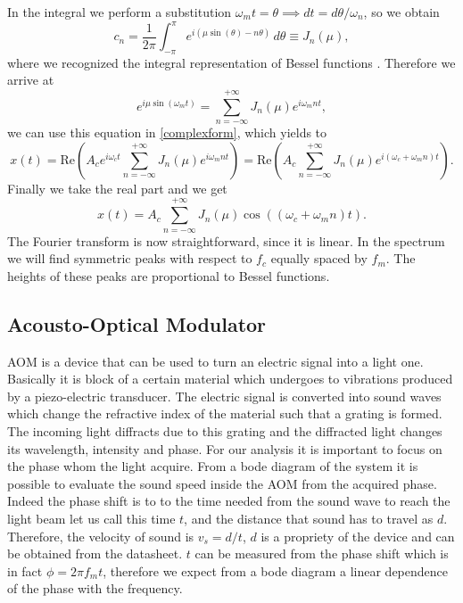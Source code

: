 \documentclass[a4paper,10pt]{article}
\begin{document}
In the integral we perform a substitution $\omega_m t = \theta \implies dt = d\theta/\omega_n$, so we obtain
\[c_n=\frac{1}{2\pi}\int_{-\pi}^{\pi}e^{i(\mu \sin(\theta)-n\theta)}\,d\theta \equiv J_n(\mu),\]
where we recognized the integral representation of Bessel functions \cite{bessel}. Therefore we arrive at
\[e^{i\mu \sin(\omega_m t)} = \sum_{n=-\infty}^{+\infty }J_n(\mu) e^{i\omega_mn t},\]
we can use this equation in \eqref{complexform}, which yields to
\[x(t) =  \text{Re}\left(A_c e^{i\omega_c t}\sum_{n=-\infty}^{+\infty }J_n(\mu) e^{i\omega_mn t}\right) =\text{Re}\left(A_c\sum_{n=-\infty}^{+\infty }J_n(\mu) e^{i(\omega_c +\omega_mn )t}\right).\]
Finally we take the real part and we get
\begin{equation}\label{finalfre}x(t) = A_c \sum_{n=-\infty}^{+\infty }J_n(\mu) \cos((\omega_c +\omega_mn )t).\end{equation}
The Fourier transform is now straightforward, since it is linear. In the spectrum we will find symmetric peaks with respect to $f_c$ equally spaced by $f_m$. The heights of these peaks are proportional to Bessel functions.
\subsection{Acousto-Optical Modulator}
AOM is a device that can be used to turn an electric signal into a light one. Basically it is block of a certain material which undergoes to vibrations produced by a piezo-electric transducer. The electric signal is converted into sound waves which change the refractive index of the material such that a grating is formed. The incoming light diffracts due to this grating and the diffracted light changes its wavelength, intensity and phase. For our analysis it is important to focus on the phase whom the light acquire. From a bode diagram of the system it is possible to evaluate the sound speed inside the AOM from the acquired phase. Indeed the phase shift is to to the time needed from the sound wave to reach the light beam let us call this time $t$, and the distance that sound has to travel as $d$. Therefore, the velocity of sound is $v_s = d/t$, $d$ is a propriety of the device and can be obtained from the datasheet. $t$ can be measured from the phase shift which is in fact $\phi = 2\pi f_m t$, therefore we expect from a bode diagram a linear dependence of the phase with the frequency.
\end{document}

